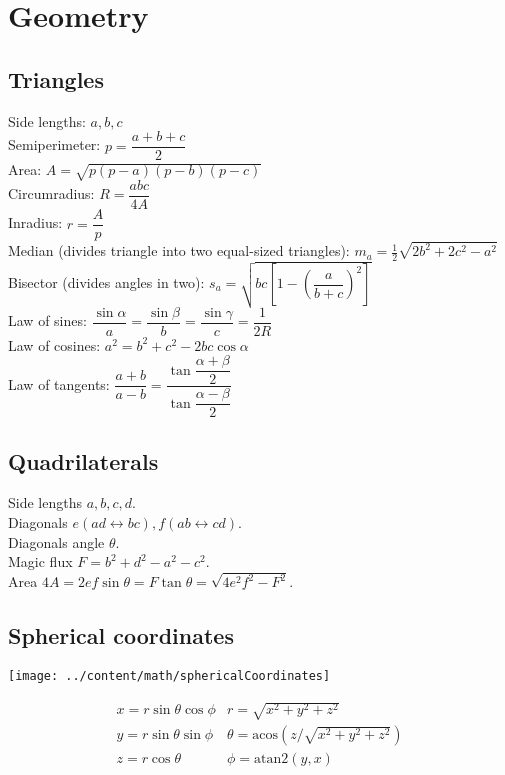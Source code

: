 \section{Geometry}

\subsection{Triangles}
Side lengths: $a,b,c$\\
Semiperimeter: $p=\dfrac{a+b+c}{2}$\\
Area: $A=\sqrt{p(p-a)(p-b)(p-c)}$\\
Circumradius: $R=\dfrac{abc}{4A}$\\
Inradius: $r=\dfrac{A}{p}$\\
Median (divides triangle into two equal-sized triangles): $m_a=\tfrac{1}{2}\sqrt{2b^2+2c^2-a^2}$\\
Bisector (divides angles in two): $s_a=\sqrt{bc\left[1-\left(\dfrac{a}{b+c}\right)^2\right]}$\\
Law of sines: $\dfrac{\sin\alpha}{a}=\dfrac{\sin\beta}{b}=\dfrac{\sin\gamma}{c}=\dfrac{1}{2R}$\\
Law of cosines: $a^2=b^2+c^2-2bc\cos\alpha$\\
Law of tangents: $\dfrac{a+b}{a-b}=\dfrac{\tan\dfrac{\alpha+\beta}{2}}{\tan\dfrac{\alpha-\beta}{2}}$\\

\subsection{Quadrilaterals}
Side lengths $a,b,c,d$.\\
Diagonals $e(ad\leftrightarrow bc), f(ab\leftrightarrow cd)$.\\
Diagonals angle $\theta$.\\
Magic flux $F=b^2+d^2-a^2-c^2$.\\
Area $4A=2ef\sin\theta=F\tan\theta=\sqrt{4e^2f^2-F^2}$.\\

\subsection{Spherical coordinates}
\centerline{\texttt{[image: ../content/math/sphericalCoordinates]}}
$$\begin{array}{cc}
x = r\sin\theta\cos\phi & r = \sqrt{x^2+y^2+z^2}\\
y = r\sin\theta\sin\phi & \theta = \textrm{acos}(z/\sqrt{x^2+y^2+z^2})\\
z = r\cos\theta & \phi = \textrm{atan2}(y,x)
\end{array}$$

